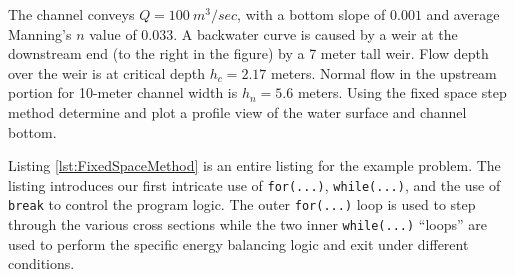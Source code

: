 The channel conveys $Q=100~m^3/sec$, with a bottom slope of $0.001$ and average Manning's $n$ value of $0.033$.  
A backwater curve is caused by a weir at the downstream end (to the right in the figure) by a 7 meter tall weir.
Flow depth over the weir is at critical depth $h_c = 2.17$ meters.  Normal flow in the upstream portion for 10-meter channel width is $h_n = 5.6$ meters.  Using the fixed space step method determine and plot a profile view of the water surface and channel bottom.

Listing \ref{lst:FixedSpaceMethod} is an entire listing for the example problem.  
The listing introduces our first intricate use of \texttt{for(...)}, \texttt{while(...)}, and the use of \texttt{break} to control the program logic.   The outer \texttt{for(...)} loop is used to step through the various cross sections while the two inner \texttt{while(...)} ``loops'' are used to perform the specific energy balancing logic and exit under different conditions.

